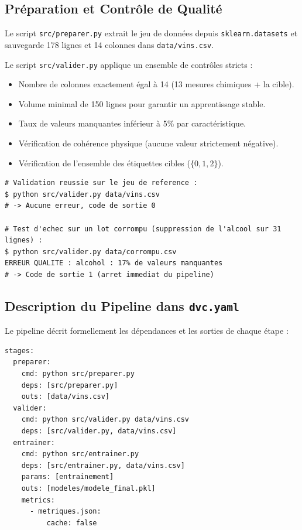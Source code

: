 \documentclass[12pt,a4paper]{article}
\begin{document}
\subsection{Préparation et Contrôle de Qualité}
Le script \texttt{src/preparer.py} extrait le jeu de données depuis \texttt{sklearn.datasets} et sauvegarde 178 lignes et 14 colonnes dans \texttt{data/vins.csv}.

Le script \texttt{src/valider.py} applique un ensemble de contrôles stricts :
\begin{itemize}[leftmargin=*]
  \item Nombre de colonnes exactement égal à 14 (13 mesures chimiques + la cible).
  \item Volume minimal de 150 lignes pour garantir un apprentissage stable.
  \item Taux de valeurs manquantes inférieur à 5\% par caractéristique.
  \item Vérification de cohérence physique (aucune valeur strictement négative).
  \item Vérification de l'ensemble des étiquettes cibles ($\{0, 1, 2\}$).
\end{itemize}

\begin{lstlisting}[style=simplebash]
# Validation reussie sur le jeu de reference :
$ python src/valider.py data/vins.csv
# -> Aucune erreur, code de sortie 0

# Test d'echec sur un lot corrompu (suppression de l'alcool sur 31 lignes) :
$ python src/valider.py data/corrompu.csv
ERREUR QUALITE : alcohol : 17% de valeurs manquantes
# -> Code de sortie 1 (arret immediat du pipeline)
\end{lstlisting}

\subsection{Description du Pipeline dans \texttt{dvc.yaml}}
Le pipeline décrit formellement les dépendances et les sorties de chaque étape :

\begin{lstlisting}[style=simplebash]
stages:
  preparer:
    cmd: python src/preparer.py
    deps: [src/preparer.py]
    outs: [data/vins.csv]
  valider:
    cmd: python src/valider.py data/vins.csv
    deps: [src/valider.py, data/vins.csv]
  entrainer:
    cmd: python src/entrainer.py
    deps: [src/entrainer.py, data/vins.csv]
    params: [entrainement]
    outs: [modeles/modele_final.pkl]
    metrics:
      - metriques.json:
          cache: false
\end{lstlisting}
\end{document}
